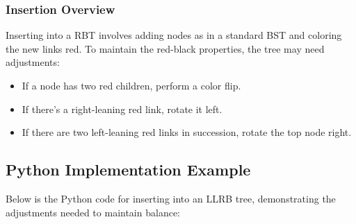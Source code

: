 \documentclass{article}
\begin{document}
\subsubsection{Insertion Overview}
Inserting into a RBT involves adding nodes as in a standard BST and coloring the new links red. To maintain the red-black properties, the tree may need adjustments:

\begin{itemize}
    \item If a node has two red children, perform a color flip.
    \item If there's a right-leaning red link, rotate it left.
    \item If there are two left-leaning red links in succession, rotate the top node right.
\end{itemize}

\subsection{Python Implementation Example}
Below is the Python code for inserting into an LLRB tree, demonstrating the adjustments needed to maintain balance:
\end{document}
